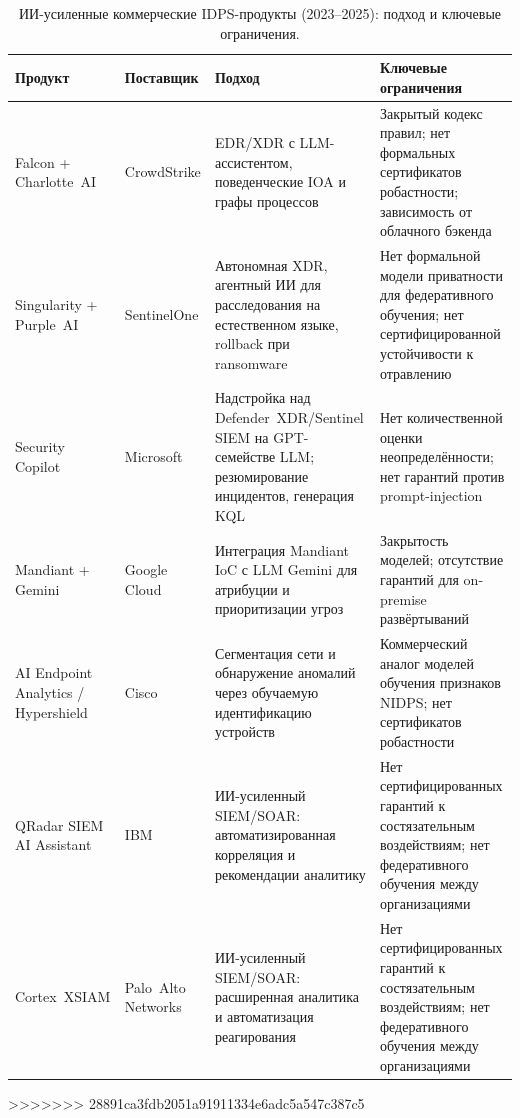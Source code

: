 \begin{table}[htbp]
\centering
\caption{ИИ-усиленные коммерческие IDPS-продукты (2023--2025): подход и ключевые ограничения.}
\label{tab:ai_idps_products}
\small
\setlength{\tabcolsep}{4pt}
\begin{tabular}{p{2.7cm} p{2.0cm} p{4.5cm} p{4.8cm}}
\toprule
\textbf{Продукт} & \textbf{Поставщик} & \textbf{Подход} & \textbf{Ключевые ограничения} \\
\midrule
Falcon + Charlotte~AI & CrowdStrike & EDR/XDR с LLM-ассистентом, поведенческие IOA и графы процессов & Закрытый кодекс правил; нет формальных сертификатов робастности; зависимость от облачного бэкенда \\
\addlinespace
Singularity + Purple~AI & SentinelOne & Автономная XDR, агентный ИИ для расследования на естественном языке, rollback при ransomware & Нет формальной модели приватности для федеративного обучения; нет сертифицированной устойчивости к отравлению \\
\addlinespace
Security Copilot & Microsoft & Надстройка над Defender~XDR/Sentinel SIEM на GPT-семействе LLM; резюмирование инцидентов, генерация KQL & Нет количественной оценки неопределённости; нет гарантий против prompt-injection \\
\addlinespace
Mandiant + Gemini & Google Cloud & Интеграция Mandiant IoC с LLM Gemini для атрибуции и приоритизации угроз & Закрытость моделей; отсутствие гарантий для on-premise развёртываний \\
\addlinespace
AI Endpoint Analytics / Hypershield & Cisco & Сегментация сети и обнаружение аномалий через обучаемую идентификацию устройств & Коммерческий аналог моделей обучения признаков NIDPS; нет сертификатов робастности \\
\addlinespace
QRadar SIEM AI Assistant & IBM & ИИ-усиленный SIEM/SOAR: автоматизированная корреляция и рекомендации аналитику & Нет сертифицированных гарантий к состязательным воздействиям; нет федеративного обучения между организациями \\
\addlinespace
Cortex~XSIAM & Palo~Alto Networks & ИИ-усиленный SIEM/SOAR: расширенная аналитика и автоматизация реагирования & Нет сертифицированных гарантий к состязательным воздействиям; нет федеративного обучения между организациями \\
\bottomrule
\end{tabular}
\end{table}
>>>>>>> 28891ca3fdb2051a91911334e6adc5a547c387c5


